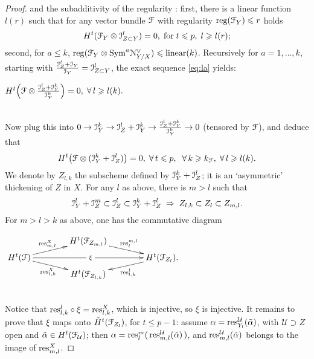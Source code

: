 \documentclass[11pt,reqno]{amsart}
\let\euf\EuScript
\let\cal\mathcal
\let\tld\tilde
\numberwithin{equation}{section}
\numberwithin{figure}{section}
\let\ges\geqslant
\let\les\leqslant
\begin{document}
\begin{proof}
and the subadditivity of the regularity \cite[Theorem 3.4]{to}: first, 
there is a linear function $l(r)$ such that for any vector bundle ${{\euf F}}$ 
with regularity ${\rm reg}({{\euf F}}_Y)\les r$ holds 
$$
H^t({{\euf F}}_Y\otimes{{\euf I}}_{Z\subset Y}^l)=0,\;\text{for}\;t\les p,\; l\ges l(r);
$$
second, for $a\les k$, 
${\rm reg}({{\euf F}}_Y\otimes{\mathop{\rm Sym}\nolimits}^a{{\euf N}}_{Y/X}^\vee)\les{\rm linear}(k)$. 
Recursively for $a=1,\ldots,k$, starting with 
$\frac{{{\euf I}}_Z^l+{{\euf I}}_Y}{{{\euf I}}_Y}={{\euf I}}_{Z\subset Y}^l$, 
the exact sequence \eqref{eq:la} yields: 
\\[.5ex] \centerline{
$
H^t\Big(
{{\euf F}}\otimes\frac{{{\euf I}}_Z^l+{{\euf I}}_Y^{k}}{{{\euf I}}_Y^{k}}
\Big)=0,\;\forall\,l\ges l(k). 
$
}\\[.5ex]
Now plug this into 
$0\to{{\euf I}}_Y^k\to{{\euf I}}_Z^l+{{\euf I}}_Y^{k}\to\frac{{{\euf I}}_Z^l+{{\euf I}}_Y^{k}}{{{\euf I}}_Y^{k}}\to0$ 
(tensored by ${{\euf F}}$), and deduce that 
$$
H^t\big({{\euf F}}\otimes({{\euf I}}_Y^k+{{\euf I}}_Z^l)\big)=0,
\;\forall\,t\les p,\;\;\forall\,k\ges k_{{\euf F}},\;\forall\,l\ges l(k).
$$
We denote by $Z_{l,k}$ the subscheme defined by ${{\euf I}}_Y^k+{{\euf I}}_Z^l$;  
it is an `asymmetric' thickening of $Z$ in $X$. 
For any $l$ as above, there is $m>l$ such that  
$$
{{\euf I}}_Y^l+{{\euf I}}_Z^m\subset{{\euf I}}_Z^l\subset{{\euf I}}_Y^k+{{\euf I}}_Z^l
\;\Rightarrow\;Z_{l,k}\subset Z_l\subset Z_{m,l}.
$$
For $m>l>k$ as above, one has the commutative diagram 
\\[.5ex] \centerline{
$
\xymatrix@R=.25em@C=4em{
&H^t({{\euf F}}_{Z_{m,l}})\ar[dr]^-{{{\rm res}}^{m,l}_l}&
\\ 
H^t({{\euf F}})
\ar[rr]|{\ \xi\ }
\ar[ur]^-{{{\rm res}}^X_{{m,l}}}
\ar[dr]_-{{{\rm res}}^X_{{l,k}}}
&& H^t({{\euf F}}_{Z_l}).\ar[dl]^-{{{\rm res}}^l_{l,k}}
\\ 
&H^t({{\euf F}}_{Z_{l,k}})&
}
$
}\\[.5ex]
Notice that ${{\rm res}}^l_{l,k}\circ \xi={{\rm res}}^X_{l,k}$, which is injective, so $\xi$ is injective. 
It remains to prove that $\xi$ maps onto $\tld H^t({{\euf F}}_{Z_l})$, for $t\les p-1$: 
assume $\alpha={{\rm res}}^{{\cal U}}_{Y_l}(\tld\alpha)$, with ${{\cal U}}\supset Z$ open and 
$\tld\alpha\in H^t({{\euf F}}_{{\cal U}})$; then $\alpha={{\rm res}}^m_l(\,{{\rm res}}^{{\cal U}}_{{m,l}}(\tld\alpha)\,)$, 
and ${{\rm res}}^{{\cal U}}_{{m,l}}(\tld\alpha)$ belongs to the image of ${{\rm res}}^{X}_{{m,l}}$.
\end{proof}
\end{document}
